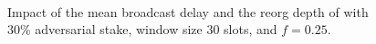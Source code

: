 \begin{figure}[htbp!]
\\
\caption{Impact of the mean broadcast delay and the reorg depth of \ProjBase with 30\% adversarial stake, window size 30 slots, and $f=0.25$.}
\label{fig:window}
\end{figure}

